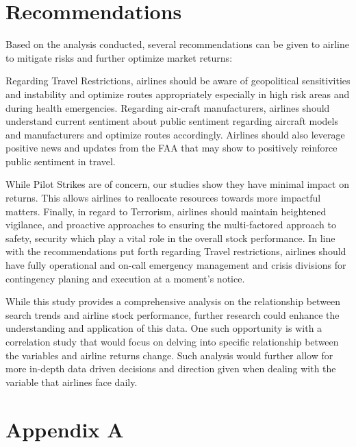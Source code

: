 \documentclass[12pt]{report}
\begin{document}
\section*{Recommendations}

Based on the analysis conducted, several recommendations can be given to airline to mitigate risks and further optimize market returns:
\par
Regarding Travel Restrictions, airlines should be aware of geopolitical sensitivities and  instability and optimize routes appropriately especially in high risk areas and during health emergencies.
Regarding air-craft manufacturers, airlines should understand current sentiment about public sentiment  regarding aircraft models and manufacturers and optimize routes accordingly.
Airlines should also leverage positive news and updates from the FAA that may show to positively reinforce public sentiment in travel.

While Pilot Strikes are of concern, our studies show they have minimal impact on returns.
This allows airlines to reallocate resources towards more impactful matters.
Finally, in regard to Terrorism, airlines should maintain heightened vigilance, and proactive approaches to ensuring the multi-factored approach to safety, security which play a vital role in the overall stock performance.
In line with the recommendations put forth regarding Travel restrictions, airlines should have fully operational and on-call emergency management and crisis divisions for contingency planing and execution at a moment's notice.

\par
While this study provides a comprehensive analysis on the relationship between search trends and airline stock performance, further research could enhance the understanding and application of this data.
One such opportunity is with a correlation study that would focus on delving into specific relationship between the variables and airline returns change.
Such analysis would further allow for more in-depth data driven decisions and direction given when dealing with the variable that airlines face daily.


\newpage



    
\newpage
{}
\section*{Appendix A}
\end{document}
